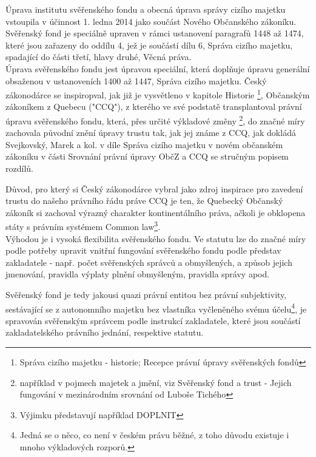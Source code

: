 \documentclass{article}
\begin{document}
Úprava institutu svěřenského fondu a obecná úprava správy cizího majetku vstoupila v účinnost 1. ledna 2014 jako součást Nového Občanského zákoníku. Svěřenský fond je speciálně upraven v rámci ustanovení paragrafů 1448 až 1474, které jsou zařazeny do oddílu 4, jež je součástí dílu 6, Správa cizího majetku, spadající do části třetí, hlavy druhé, Věcná práva. \\

Úprava svěřenského fondu jest úpravou speciální, která doplňuje úpravu generální obsaženou v ustanoveních 1400 až 1447, Správa cizího majetku. Český zákonodárce se inspiropval, jak již je vysvětleno v kapitole Historie \footnote{Správa cizího majetku - historie; Recepce právní úpravy svěřenských fondů}, Občanským zákoníkem z Quebecu ("CCQ"), z kterého ve své podstatě transplantoval právní úpravu svěřenského fondu, která, přes určité výkladové změny \footnote{například v pojmech majetek a jmění, viz Svěřenský fond a trust - Jejich fungování v mezinárodním srovnání od Luboše Tichého}, do značné míry zachovala původní znění úpravy trustu tak, jak jej známe z CCQ, jak dokládá Svejkovský, Marek a kol. v díle Správa cizího majetku v novém občanském zákoníku v části Srovnání právní úpravy ObčZ a CCQ se stručným popisem rozdílů. 

\newpage
\thispagestyle{smallertextinheader}

Důvod, pro který si Český zákonodárce vybral jako zdroj inspirace pro zavedení trustu do našeho právního řádu práve CCQ je ten, že Quebecký Občanský zákoník si zachoval výrazný charakter kontinentálního práva, ačkoli je obklopena státy s právním systémem Common law\footnote{Výjimku představují například DOPLNIT}.\\

Výhodou je i vysoká flexibilita svěřenského fondu. Ve statutu lze do značné míry podle potřeby upravit vnitřní fungování svěřenského fondu podle představ zakladatele - např. počet svěřenských správců a obmyšlených, a způsob jejich jmenování, pravidla výplaty plnění obmyšleným, pravidla správy apod.


Svěřenský fond je tedy jakousi quazi právní entitou bez právní subjektivity, sestávající se z autonomního majetku bez vlastníka vyčleněného svému účelu\footnote{Jedná se o něco, co není v českém právu běžné, z toho důvodu existuje i mnoho výkladových rozporů.}, je spravován svěřenským správcem podle instrukcí zakladatele, které jsou součástí zakladatelského právního jednání, respektive statutu.\\
\end{document}
